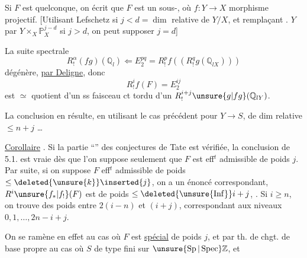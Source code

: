 

Si $F$ est quelconque, on écrit que $F$ est un sous-, où $f:Y\longrightarrow X$ morphisme projectif. [Utilisant Lefschetz    si $j<d=\dim$ relative de $Y/X$, et remplaçant . $Y$ par $Y\times_X\mathbb P_X^{j-d}$ si $j>d$, on peut supposer $j=d$]


La suite spectrale
\[
R^\alpha_!(fg)(\mathbb Q_l)\Longleftarrow E^{pq}_2=R^p_!f((R^q_!g(\mathbb Q_{lX})))
\]
dégénère, \uline{par Deligne}, donc
\[
R^i_!f(F)=E^{ij}_2
\]
est $\simeq$ quotient  d'un ss faisceau ct tordu d'un $R^{i+j}_!\unsure{g|fg}(\mathbb Q_{lY})$.

\margin{[N.B. Voir si Deligne ne peut se remplacer par \uline{\unsure{factorisation} de Artin} sur $X\longrightarrow S$, \unsure{puis} ramener au cas de $n=1$\ldots]}

La conclusion en résulte, en utilisant le cas précédent pour $Y\longrightarrow S$, de dim relative $\leq n+j$ \ldots

\uline{Corollaire} . Si la partie ``'' des conjectures de Tate est vérifiée, la conclusion de 5.1. est vraie dès que l'on suppose seulement que $F$ est eff$^{t}$ admissible de poids $j$. Par suite, si on suppose $F$ eff$^{t}$ admissible de poids $\leq\deleted{\unsure{k}}\inserted{j}$, on a un énoncé correspondant,  $R^i\unsure{f_*|f_!}(F)$ est  de poids $\leq\deleted{\unsure{\operatorname{Inf}}}i+j$,  . Si $i\geq n$, on trouve des poids entre $2(i-n)$ et $(i+j)$, correspondant aux niveaux $0,1,\ldots,2n-i+j$.

On se ramène en effet  au cas où $F$ est \uline{spécial} de poids $j$, et par th. de chgt. de base propre au cas où $S$ de type fini sur $\unsure{\operatorname{Sp}|\operatorname{Spec}}\mathbb Z$, et

